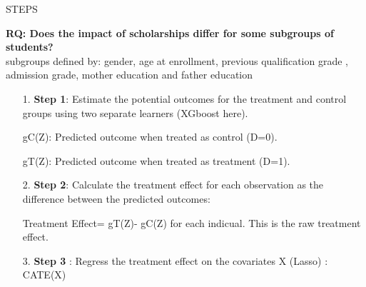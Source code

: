 \documentclass[aspectratio=169]{beamer}
\begin{document}
\begin{frame}{STEPS}

\textbf{RQ: Does the impact of scholarships differ for some subgroups of students? \\}
subgroups defined by: gender, age at enrollment, previous qualification grade , admission grade, mother education and father education

\begin{itemize}
    \item[1.] \textbf{Step 1}: Estimate the potential outcomes for the treatment and control groups using two separate learners (XGboost here).

gC(Z): Predicted outcome when treated as control (D=0).

gT(Z): Predicted outcome when treated as treatment (D=1).


    \item[2.] \textbf{Step 2}: Calculate the treatment effect for each observation as the difference between the predicted outcomes:

Treatment Effect= gT(Z)- gC(Z) for each indicual. This is the raw treatment effect.


    \item[3.] \textbf{Step 3} : Regress the treatment effect on the covariates X (Lasso) : CATE(X)
\end{itemize}

    
\end{frame}
    
\end{document}
